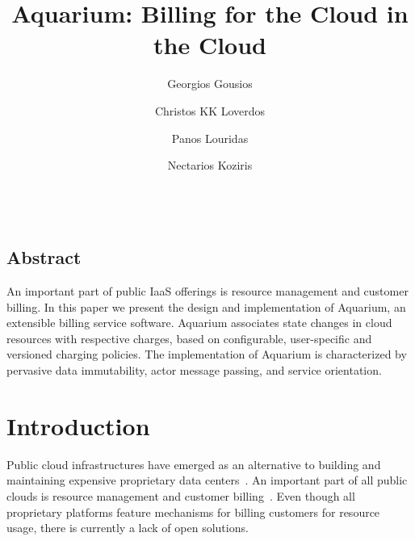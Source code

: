\documentclass[letterpaper,twocolumn,10pt]{article}
\begin{document}
\date{}

\title{Aquarium: Billing for the Cloud in the Cloud}

\author{
{\rm Georgios Gousios}\\
\and
{\rm Christos KK Loverdos}\\
\and
{\rm Panos Louridas}\\
\and
{\rm Nectarios Koziris}\\
\and
{}\\
} %

\maketitle


\thispagestyle{empty}

\subsection*{Abstract}

An important part of public IaaS offerings is resource management and
customer billing. In this paper we present the design and
implementation of Aquarium, an extensible billing service software.
Aquarium associates state changes in cloud resources with respective
charges, based on configurable, user-specific and versioned charging
policies. The implementation of Aquarium is characterized by pervasive
data immutability, actor message passing, and service orientation.

\section{Introduction}

Public cloud infrastructures have emerged as an alternative to
building and maintaining expensive proprietary data
centers~\cite{Lourid10}. An important part of all public clouds is
resource management and customer billing~\cite{Armbr10}. Even though
all proprietary platforms feature mechanisms for billing customers for
resource usage, there is currently a lack of open solutions.
\end{document}

